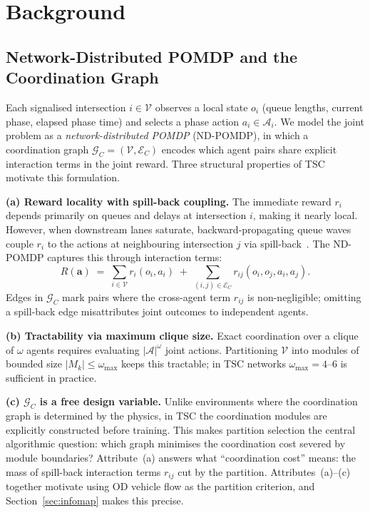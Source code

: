 \documentclass{article}
\begin{document}
\section{Background}
\label{sec:background}

\subsection{Network-Distributed POMDP and the Coordination Graph}
\label{sec:ndpomdp}

Each signalised intersection $i \in \mathcal{V}$ observes a local state
$o_i$ (queue lengths, current phase, elapsed phase time) and selects a
phase action $a_i \in \mathcal{A}_i$.
We model the joint problem as a \emph{network-distributed POMDP} (ND-POMDP),
in which a coordination graph $\mathcal{G}_C = (\mathcal{V}, \mathcal{E}_C)$
encodes which agent pairs share explicit interaction terms in the joint reward.
Three structural properties of TSC motivate this formulation.

\textbf{(a) Reward locality with spill-back coupling.}
The immediate reward $r_i$ depends primarily on queues and delays at
intersection $i$, making it nearly local.
However, when downstream lanes saturate, backward-propagating queue waves
couple $r_i$ to the actions at neighbouring intersection $j$ via
spill-back~\citep{dependencydyn2025}.
The ND-POMDP captures this through interaction terms:
\begin{equation}
    R(\mathbf{a})
    \;=\; \sum_{i \in \mathcal{V}} r_i(o_i, a_i)
    \;+\; \sum_{(i,j)\in\mathcal{E}_C} r_{ij}(o_i, o_j, a_i, a_j).
    \label{eq:ndpomdp}
\end{equation}
Edges in $\mathcal{G}_C$ mark pairs where the cross-agent term $r_{ij}$ is
non-negligible; omitting a spill-back edge misattributes joint outcomes to
independent agents.

\textbf{(b) Tractability via maximum clique size.}
Exact coordination over a clique of $\omega$ agents requires evaluating
$|\mathcal{A}|^\omega$ joint actions.
Partitioning $\mathcal{V}$ into modules of bounded size
$|M_k| \leq \omega_{\max}$ keeps this tractable; in TSC networks
$\omega_{\max} = 4$--$6$ is sufficient in practice.

\textbf{(c) $\mathcal{G}_C$ is a free design variable.}
Unlike environments where the coordination graph is determined by the physics,
in TSC the coordination modules are explicitly constructed before training.
This makes partition selection the central algorithmic question: which graph
minimises the coordination cost severed by module boundaries?
Attribute~(a) answers what ``coordination cost'' means: the mass of spill-back
interaction terms $r_{ij}$ cut by the partition.
Attributes~(a)–(c) together motivate using OD vehicle flow as the partition
criterion, and Section~\ref{sec:infomap} makes this precise.
\end{document}
